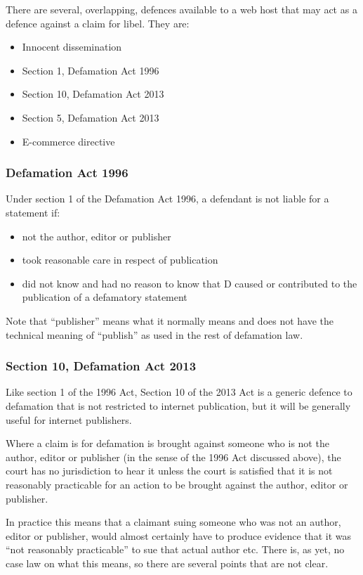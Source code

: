 \documentclass[]{article}
\begin{document}
There are several, overlapping, defences available to a web host that may act as a defence against a claim for libel. They are:

\begin{itemize}
\item Innocent dissemination
\item Section 1, Defamation Act 1996
\item Section 10, Defamation Act 2013
\item Section 5, Defamation Act 2013
\item E-commerce directive
\end{itemize}

\subsubsection{Defamation Act 1996}

Under section 1 of the Defamation Act 1996, a defendant is not liable
for a statement if:

\begin{itemize}
\item
  not the author, editor or publisher
\item
  took reasonable care in respect of publication
\item
  did not know and had no reason to know that D caused or contributed to
  the publication of a defamatory statement
\end{itemize}

Note that ``publisher'' means what it normally means and does not have
the technical meaning of ``publish'' as used in the rest of defamation
law.

\subsubsection{Section 10, Defamation Act 2013}
Like section 1 of the 1996 Act, Section 10 of the 2013 Act is a generic defence to defamation that is not restricted to internet publication, but it will be generally useful for internet publishers.

Where a claim is for defamation is brought against someone who is not the author, editor or publisher (in the sense of the 1996 Act discussed above), the court has no jurisdiction to hear it unless the court is satisfied that it is not reasonably practicable for an action to be brought against the author, editor or publisher.

In practice this means that a claimant suing someone who was not an author, editor or publisher, would almost certainly have to produce evidence that it was ``not reasonably practicable'' to sue that actual author etc. There is, as yet, no case law on what this means, so there are several points that are not clear.
\end{document}
